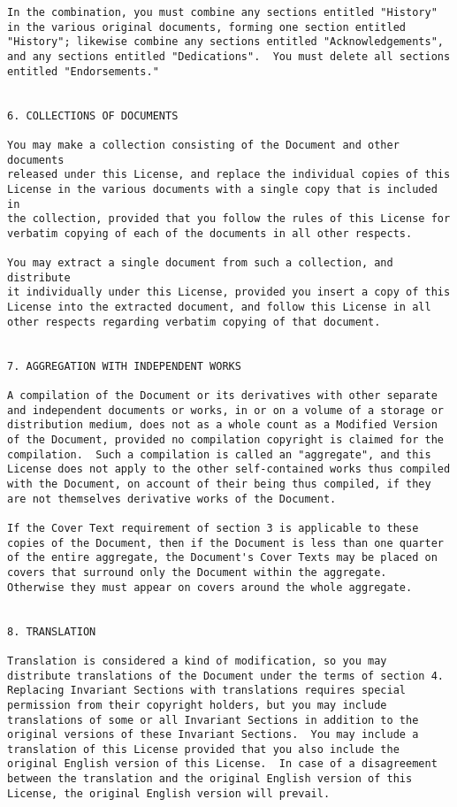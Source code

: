 \documentclass{report}
\begin{document}
\begin{verbatim}
In the combination, you must combine any sections entitled "History"
in the various original documents, forming one section entitled
"History"; likewise combine any sections entitled "Acknowledgements",
and any sections entitled "Dedications".  You must delete all sections
entitled "Endorsements."


6. COLLECTIONS OF DOCUMENTS

You may make a collection consisting of the Document and other documents
released under this License, and replace the individual copies of this
License in the various documents with a single copy that is included in
the collection, provided that you follow the rules of this License for
verbatim copying of each of the documents in all other respects.

You may extract a single document from such a collection, and distribute
it individually under this License, provided you insert a copy of this
License into the extracted document, and follow this License in all
other respects regarding verbatim copying of that document.


7. AGGREGATION WITH INDEPENDENT WORKS

A compilation of the Document or its derivatives with other separate
and independent documents or works, in or on a volume of a storage or
distribution medium, does not as a whole count as a Modified Version
of the Document, provided no compilation copyright is claimed for the
compilation.  Such a compilation is called an "aggregate", and this
License does not apply to the other self-contained works thus compiled
with the Document, on account of their being thus compiled, if they
are not themselves derivative works of the Document.

If the Cover Text requirement of section 3 is applicable to these
copies of the Document, then if the Document is less than one quarter
of the entire aggregate, the Document's Cover Texts may be placed on
covers that surround only the Document within the aggregate.
Otherwise they must appear on covers around the whole aggregate.


8. TRANSLATION

Translation is considered a kind of modification, so you may
distribute translations of the Document under the terms of section 4.
Replacing Invariant Sections with translations requires special
permission from their copyright holders, but you may include
translations of some or all Invariant Sections in addition to the
original versions of these Invariant Sections.  You may include a
translation of this License provided that you also include the
original English version of this License.  In case of a disagreement
between the translation and the original English version of this
License, the original English version will prevail.



\end{verbatim}
\end{document}
